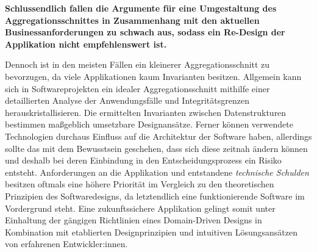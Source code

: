 \textbf{Schlussendlich fallen die Argumente für eine Umgestaltung des Aggregationsschnittes in Zusammenhang mit den aktuellen Businessanforderungen zu schwach aus, sodass ein Re-Design der Applikation nicht empfehlenswert ist.}

Dennoch ist in den meisten Fällen ein kleinerer Aggregationsschnitt zu bevorzugen, da viele Applikationen kaum Invarianten besitzen. Allgemein kann sich in Softwareprojekten ein idealer Aggregationsschnitt mithilfe einer detaillierten Analyse der Anwendungsfälle und Integritätsgrenzen herauskristallisieren. Die ermittelten Invarianten zwischen Datenstrukturen bestimmen maßgeblich umsetzbare Designansätze. Ferner können verwendete Technologien durchaus Einfluss auf die Architektur der Software haben, allerdings sollte das mit dem Bewusstsein geschehen, dass sich diese zeitnah ändern können und deshalb bei deren Einbindung in den Entscheidungsprozess ein Risiko entsteht. Anforderungen an die Applikation und entstandene \emph{\gls{technische Schulden}} besitzen oftmals eine höhere Priorität im Vergleich zu den theoretischen Prinzipien des Softwaredesigns, da letztendlich eine funktionierende Software im Vordergrund steht. Eine zukunftssichere Applikation gelingt somit unter Einhaltung der gängigen Richtlinien eines Domain-Driven Designs in Kombination mit etablierten Designprinzipien und intuitiven Lösungsansätzen von erfahrenen Entwickler:innen.  